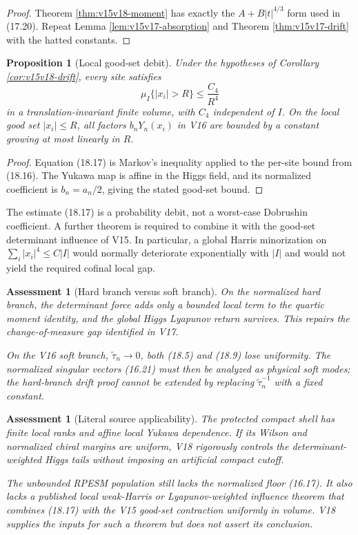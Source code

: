 \documentclass[11pt]{article}
\newtheorem{proposition}[theorem]{Proposition}
\newtheorem{assessment}[theorem]{Assessment}
\theoremstyle{remark}
\begin{document}
\begin{proof}
Theorem \ref{thm:v15v18-moment} has exactly the
\(A+B|t|^{4/3}\) form used in (17.20).  Repeat Lemma
\ref{lem:v15v17-absorption} and Theorem
\ref{thm:v15v17-drift} with the hatted constants.
\end{proof}

\begin{proposition}[Local good-set debit]
\label{prop:v15v18-good-set}
Under the hypotheses of Corollary \ref{cor:v15v18-drift}, every
site satisfies
\[
 \mu_I\{|x_i|>R\}
 \le\frac{C_4}{R^4}                                        \tag{18.17}
\]
in a translation-invariant finite volume, with \(C_4\) independent
of \(I\).  On the local good set \(|x_i|\le R\), all factors
\(b_nY_n(x_i)\) in V16 are bounded by a constant growing at most
linearly in \(R\).
\end{proposition}

\begin{proof}
Equation (18.17) is Markov's inequality applied to the per-site
bound from (18.16).  The Yukawa map is affine in the Higgs field,
and its normalized coefficient is \(b_n=a_n/2\), giving the stated
good-set bound.
\end{proof}

The estimate (18.17) is a probability debit, not a worst-case
Dobrushin coefficient.  A further theorem is required to combine it
with the good-set determinant influence of V15.  In particular, a
global Harris minorization on
\(\sum_i|x_i|^4\le C|I|\) would normally deteriorate exponentially
with \(|I|\) and would not yield the required cofinal local gap.

\begin{assessment}[Hard branch versus soft branch]
\label{ass:v15v18-branches}
On the normalized hard branch, the determinant force adds only a
bounded local term to the quartic moment identity, and the global
Higgs Lyapunov return survives.  This repairs the change-of-measure
gap identified in V17.

On the V16 soft branch,
\(\widetilde\tau_n\to0\), both (18.5) and (18.9) lose uniformity.
The normalized singular vectors (16.21) must then be analyzed as
physical soft modes; the hard-branch drift proof cannot be extended
by replacing \(\widetilde\tau_n^{-1}\) with a fixed constant.
\end{assessment}

\begin{assessment}[Literal source applicability]
\label{ass:v15v18-source}
The protected compact shell has finite local ranks and affine local
Yukawa dependence.  If its Wilson and normalized chiral margins are
uniform, V18 rigorously controls the determinant-weighted Higgs
tails without imposing an artificial compact cutoff.

The unbounded RPESM population still lacks the normalized floor
(16.17).  It also lacks a published local weak-Harris or
Lyapunov-weighted influence theorem that combines (18.17) with the
V15 good-set contraction uniformly in volume.  V18 supplies the
inputs for such a theorem but does not assert its conclusion.
\end{assessment}
\end{document}
